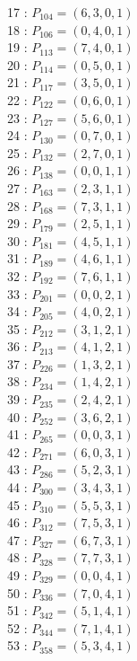 \documentclass{article}
\begin{document}
{\begin{multicols}{3}
17 : $P_{104}=( 6, 3, 0, 1 )$\\
18 : $P_{106}=( 0, 4, 0, 1 )$\\
19 : $P_{113}=( 7, 4, 0, 1 )$\\
20 : $P_{114}=( 0, 5, 0, 1 )$\\
21 : $P_{117}=( 3, 5, 0, 1 )$\\
22 : $P_{122}=( 0, 6, 0, 1 )$\\
23 : $P_{127}=( 5, 6, 0, 1 )$\\
24 : $P_{130}=( 0, 7, 0, 1 )$\\
25 : $P_{132}=( 2, 7, 0, 1 )$\\
26 : $P_{138}=( 0, 0, 1, 1 )$\\
27 : $P_{163}=( 2, 3, 1, 1 )$\\
28 : $P_{168}=( 7, 3, 1, 1 )$\\
29 : $P_{179}=( 2, 5, 1, 1 )$\\
30 : $P_{181}=( 4, 5, 1, 1 )$\\
31 : $P_{189}=( 4, 6, 1, 1 )$\\
32 : $P_{192}=( 7, 6, 1, 1 )$\\
33 : $P_{201}=( 0, 0, 2, 1 )$\\
34 : $P_{205}=( 4, 0, 2, 1 )$\\
35 : $P_{212}=( 3, 1, 2, 1 )$\\
36 : $P_{213}=( 4, 1, 2, 1 )$\\
37 : $P_{226}=( 1, 3, 2, 1 )$\\
38 : $P_{234}=( 1, 4, 2, 1 )$\\
39 : $P_{235}=( 2, 4, 2, 1 )$\\
40 : $P_{252}=( 3, 6, 2, 1 )$\\
41 : $P_{265}=( 0, 0, 3, 1 )$\\
42 : $P_{271}=( 6, 0, 3, 1 )$\\
43 : $P_{286}=( 5, 2, 3, 1 )$\\
44 : $P_{300}=( 3, 4, 3, 1 )$\\
45 : $P_{310}=( 5, 5, 3, 1 )$\\
46 : $P_{312}=( 7, 5, 3, 1 )$\\
47 : $P_{327}=( 6, 7, 3, 1 )$\\
48 : $P_{328}=( 7, 7, 3, 1 )$\\
49 : $P_{329}=( 0, 0, 4, 1 )$\\
50 : $P_{336}=( 7, 0, 4, 1 )$\\
51 : $P_{342}=( 5, 1, 4, 1 )$\\
52 : $P_{344}=( 7, 1, 4, 1 )$\\
53 : $P_{358}=( 5, 3, 4, 1 )$\\

\end{multicols}}
\end{document}
